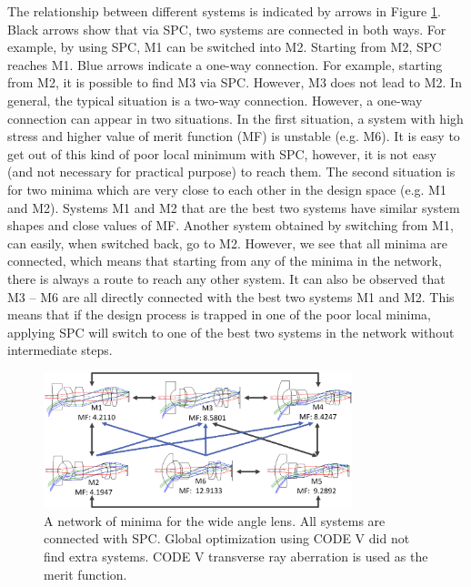 The relationship between different systems is indicated by arrows in Figure \ref{fig:WAL_network}. Black arrows show that via SPC, two systems are connected in both ways. For example, by using SPC, M1 can be switched into M2. Starting from M2, SPC reaches M1. Blue arrows indicate a one-way connection. For example, starting from M2, it is possible to find M3 via SPC. However, M3 does not lead to M2. In general, the typical situation is a two-way connection. However, a one-way connection can appear in two situations. In the first situation, a system with high stress and higher value of merit function (MF) is unstable (e.g. M6). It is easy to get out of this kind of poor local minimum with SPC, however, it is not easy (and not necessary for practical purpose) to reach them. The second situation is for two minima which are very close to each other in the design space (e.g. M1 and M2). Systems M1 and M2 that are the best two systems have similar system shapes and close values of MF. Another system obtained by switching from M1, can easily, when switched back, go to M2. However, we see that all minima are connected, which means that starting from any of the minima in the network, there is always a route to reach any other system. It can also be observed that M3 – M6 are all directly connected with the best two systems M1 and M2. This means that if the design process is trapped in one of the poor local minima, applying SPC will switch to one of the best two systems in the network without intermediate steps.  

\begin{figure}[h!]
    \centering
    \includegraphics[width=0.8\textwidth]{chapter-4/figures/WAL_network.png}
    \caption{A network of minima for the wide angle lens. All systems are connected with SPC. Global optimization using CODE V did not find extra systems. CODE V transverse ray aberration is used as the merit function.}
    \label{fig:WAL_network}
\end{figure}

